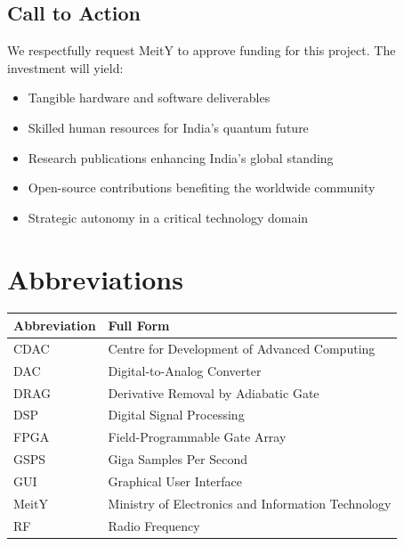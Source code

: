 \documentclass[12pt,a4paper]{article}
\theoremstyle{definition}
\begin{document}
\subsection{Call to Action}

We respectfully request MeitY to approve funding for this project. The investment will yield:

\begin{itemize}
    \item Tangible hardware and software deliverables
    \item Skilled human resources for India's quantum future
    \item Research publications enhancing India's global standing
    \item Open-source contributions benefiting the worldwide community
    \item Strategic autonomy in a critical technology domain
\end{itemize}

\begin{center}
\end{center}

\newpage
\printbibliography[heading=bibintoc, title={References}]

\appendix

\section{Abbreviations}
\label{app:abbreviations}

\begin{table}[htbp]
\centering
\begin{tabular}{@{}ll@{}}
\toprule
\textbf{Abbreviation} & \textbf{Full Form} \\
\midrule
CDAC & Centre for Development of Advanced Computing \\
DAC & Digital-to-Analog Converter \\
DRAG & Derivative Removal by Adiabatic Gate \\
DSP & Digital Signal Processing \\
FPGA & Field-Programmable Gate Array \\
GSPS & Giga Samples Per Second \\
GUI & Graphical User Interface \\
MeitY & Ministry of Electronics and Information Technology \\
RF & Radio Frequency \\
\bottomrule
\end{tabular}
\end{table}
\end{document}
